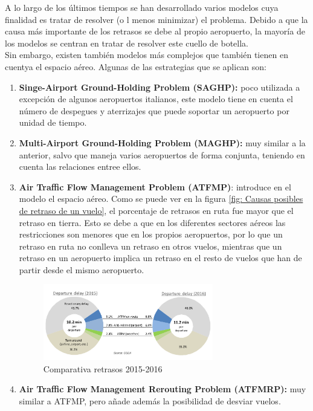 A lo largo de los últimos tiempos se han desarrollado varios modelos cuya finalidad es tratar de resolver (o l menos minimizar) el problema. Debido a que la causa más importante de los retrasos se debe al propio aeropuerto, la mayoría de los modelos se centran en tratar de resolver este cuello de botella. \\
Sin embargo, existen también modelos más complejos que también tienen en cuentya el espacio aéreo. Algunas de las estrategias que se aplican son:

\begin{enumerate}
	\item \textbf{Singe-Airport Ground-Holding Problem (SAGHP):} poco utilizada a excepción de algunos aeropuertos italianos, este modelo tiene en cuenta el número de despegues y aterrizajes que puede soportar un aeropuerto por unidad de tiempo.
	\item \textbf{Multi-Airport Ground-Holding Problem (MAGHP): }muy similar a la anterior, salvo que maneja varios aeropuertos de forma conjunta, teniendo en cuenta las relaciones entree ellos.
	\item \textbf{Air Traffic Flow Management Problem (ATFMP)}: introduce en el modelo el espacio aéreo. Como se puede ver en la figura \ref{fig: Causas posibles de retraso de un vuelo}, el porcentaje de retrasos en ruta fue mayor que el retraso en tierra. Esto se debe a que en los diferentes sectores aéreos las restricciones son menores que en los propios aeropuertos, por lo que un retraso en ruta no conlleva un retraso en otros vuelos, mientras que un retraso en un aeropuerto implica un retraso en el resto de vuelos que han de partir desde el mismo aeropuerto.
	\begin{figure}[H]
		\begin{center}
			\centering
			\includegraphics[width=0.7\textwidth]{./imagenes/introduccion/retrasosSalida.png}
			\caption{Comparativa retrasos 2015-2016}
			\label{fig: Comparativa retrasos 2015-2016}
		\end{center}
	\end{figure}
	\item \textbf{Air Traffic Flow Management Rerouting Problem (ATFMRP): }muy similar a ATFMP, pero añade además la posibilidad de desviar vuelos.

\end{enumerate}
